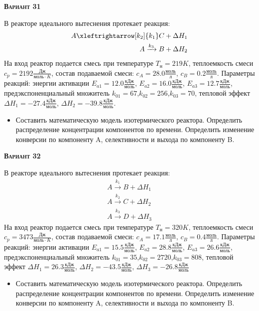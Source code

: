 \textsc{\textbf{Вариант 31}}

 В реакторе идеального вытеснения протекает реакция: \begin{equation*} \begin{aligned} A \xleftrightarrow[k_2]{k_1} C + \Delta H_1 \\ A \xrightarrow{k_3} B + \Delta H_2 \end{aligned} \end{equation*}                              На вход  реактор подается смесь при температуре $ T_{н} =  219 K$, теплоемкость смеси $c_p= 2192 \frac{Дж}{моль \cdot K}$, состав подаваемой смеси: $c_A=28.0 \frac{моль}{л}$, $c_B=0.2 \frac{моль}{л}$. Параметры реакций: энергии активации $E_{a1}=12.0 \frac{кДж}{моль}$, $E_{a2}=16.0  \frac{кДж}{моль}$, $E_{a3}=12.7  \frac{кДж}{моль}$, предэкспоненциальный множитель $k_{01}=        67$,$k_{02}=       256$,$k_{03}=        70$, тепловой эффект $\Delta H_1= -27.4  \frac{кДж}{моль}$, $\Delta H_2=-39.8 \frac{кДж}{моль}$.\begin{itemize} \item Составить математическую модель изотермического реактора. Определить распределение концентрации компонентов по времени. Определить изменение конверсии по компоненту A, селективности и выхода по компоненту B. \end{itemize}

\textsc{\textbf{Вариант 32}}

 В реакторе идеального вытеснения протекает реакция: \begin{equation*} \begin{aligned} A \xrightarrow{k_1} B + \Delta H_1 \\ A \xrightarrow{k_2} C + \Delta H_2 \\ A \xrightarrow{k_3} D + \Delta H_3 \end{aligned} \end{equation*} На вход  реактор подается смесь при температуре $ T_{н} =  320 K$, теплоемкость смеси $c_p= 3473 \frac{Дж}{моль \cdot K}$, состав подаваемой смеси: $c_A=17.1 \frac{моль}{л}$, $c_B=0.4 \frac{моль}{л}$. Параметры реакций: энергии активации $E_{a1}=15.5 \frac{кДж}{моль}$, $E_{a2}=28.8  \frac{кДж}{моль}$, $E_{a3}=26.6  \frac{кДж}{моль}$, предэкспоненциальный множитель $k_{01}=        35$,$k_{02}=      2720$,$k_{03}=       808$, тепловой эффект $\Delta H_1= 26.3 \frac{кДж}{моль}$, $\Delta H_2=-43.5 \frac{кДж}{моль}$, $\Delta H_3 = -26.8 \frac{кДж}{моль}$\begin{itemize} \item Составить математическую модель изотермического реактора. Определить распределение концентрации компонентов по времени. Определить изменение конверсии по компоненту A, селективности и выхода по компоненту B. \end{itemize}

